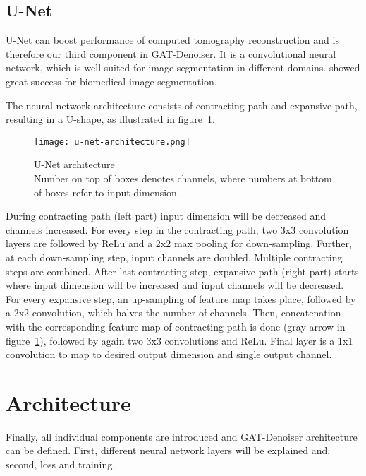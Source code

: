 \subsection{U-Net}
\label{sec:unet}
U-Net can boost performance of computed tomography reconstruction and is therefore our third component
in GAT-Denoiser.
It is a convolutional neural network, which is well suited for image segmentation in different domains.
\cite{unet-tomography} showed great success for biomedical image segmentation.

The neural network architecture consists of contracting path and expansive path,
resulting in a U-shape, as illustrated in figure~\ref{fig:u-net-architectue}.

\begin{figure}[H]
  \centering
  \label{fig:u-net-architectue}
  \texttt{[image: u-net-architecture.png]}
  \caption{
    U-Net architecture \cite[p 2, Fig. 1]{unet-tomography} \\
    Number on top of boxes denotes channels, where numbers at bottom of boxes refer to input dimension.
    }
\end{figure}


During contracting path (left part) input dimension will be decreased and channels increased.
For every step in the contracting path, two 3x3 convolution layers are followed by ReLu
and a 2x2 max pooling for down-sampling. Further, at each down-sampling step, input channels are doubled.
Multiple contracting steps are combined. After last contracting step, expansive path (right part) starts
where input dimension will be increased and input channels will be decreased.
For every expansive step, an up-sampling of feature map takes place, followed by a 2x2 convolution, 
which halves the number of channels. Then, concatenation with the corresponding feature
map of contracting path is done (gray arrow in figure~\ref{fig:u-net-architectue}), followed by again two 3x3 convolutions and ReLu.
Final layer is a 1x1 convolution to map to desired output dimension and single output channel.

\section{Architecture}
\label{sec:architecture-GatDenoiser}
Finally, all individual components are introduced and GAT-Denoiser architecture can be defined.
First, different neural network layers will be explained and, second, loss and training.

